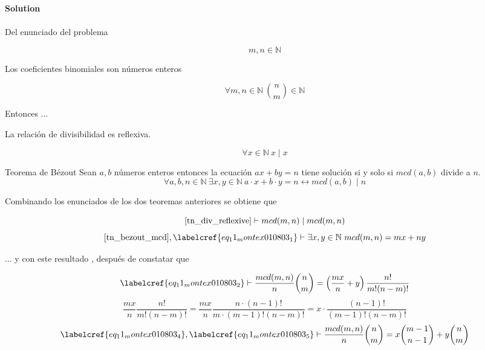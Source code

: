 \noindent\textbf{Solution } \\\\

Del enunciado del problema 

\begin{equation} \label{eq_11_montex010803_0a}
	m,n \in \mathbb{N}
\end{equation}

Los coeficientes binomiales son números enteros

\begin{equation} \label{eq_11_montex010803_0}
	\forall m,n \in \mathbb{N}\ {n \choose m} \in \mathbb{N}
\end{equation}

Entonces ...

\begin{theorem} \label{tn_div_reflexive}
	La relación de divisibilidad es reflexiva.
	
	\begin{equation} \label{eq_tn_div_reflexive}
		\forall x \in \mathbb{N}\ x \mid x
	\end{equation}
\end{theorem}

\begin{theorem} \label{tn_bezout_mcd} Teorema de Bézout
	Sean $a, b$ números enteros entonces la ecuación $ax + by = n$ tiene solución si y solo si $mcd(a,b)$ divide a $n$.
	\begin{equation} \label{eq_tn_bezout_mcd}
		\forall a,b,n \in \mathbb{N}\ \exists x,y \in \mathbb{N}\ a \cdot x+b \cdot y = n \leftrightarrow mcd(a,b) \mid n
	\end{equation}
\end{theorem}

Combinando los enunciados de los dos teoremas anteriores se obtiene que

\begin{equation} \label{eq_11_montex010803_1}
	\cref{tn_div_reflexive} \vdash mcd(m,n) \mid mcd(m,n)
\end{equation}
\begin{equation} \label{eq_11_montex010803_2}
	\cref{tn_bezout_mcd}, \labelcref{eq_11_montex010803_1} \vdash \exists x,y \in \mathbb{N}\ mcd(m,n) = mx + ny
\end{equation}

... y con este resultado , después de constatar que 

\begin{equation} \label{eq_11_montex010803_3}
	\labelcref{eq_11_montex010803_2} \vdash \frac{mcd(m,n)}{n}{n \choose m} = \left(\frac{mx}{n} + y\right) \frac{n!}{m! (n-m)!}
\end{equation}
\begin{equation} \label{eq_11_montex010803_4}
	\frac{mx}{n} \frac{n!}{m! (n-m)!} = \frac{mx}{n} \frac{n \cdot (n-1)!}{m \cdot (m-1)! (n-m)!} = x \cdot \frac{(n-1)!}{(m-1)!(n-m)!}
\end{equation}
\begin{equation} \label{eq_11_montex010803_5}
	\labelcref{eq_11_montex010803_4}, \labelcref{eq_11_montex010803_5} \vdash \frac{mcd(m,n)}{n} {n \choose m} = x {{m-1} \choose {n-1}} + y {n \choose m}
\end{equation}

